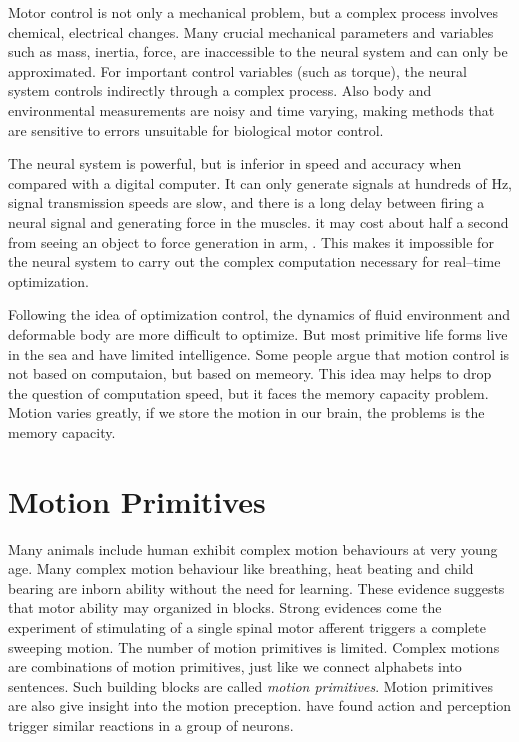 \begin{itemize}
Motor control is not only a mechanical problem, but a complex process involves chemical, electrical changes.
Many crucial mechanical parameters and variables such as mass, inertia, force, are inaccessible to the neural system and can only be approximated. 
For important control variables (such as torque), the neural system controls indirectly through a complex process.
Also body and environmental measurements are noisy and time varying, making methods that are sensitive to errors unsuitable for biological motor control.

The neural system is powerful, but is inferior in speed and accuracy when compared with a digital computer. 
It can only generate signals at hundreds of Hz, signal transmission speeds are slow, and there is a long delay between firing a neural signal and generating force in the muscles.
it may cost about half a second from seeing an object to force generation in arm, . 
This makes it impossible for the neural system to carry out the complex computation necessary for real–time optimization.


Following the idea of optimization control, the dynamics of fluid environment and deformable body are more difficult to optimize. 
But most primitive life forms live in the sea and have limited intelligence. 
Some people argue that motion control is not based on computaion, but based on memeory.
This idea may helps to drop the question of computation speed, but it faces the memory capacity problem. 
Motion varies greatly, if we store the motion in our brain, the problems is the memory capacity.
\end{itemize}

\section{Motion Primitives}
Many animals include human exhibit complex motion behaviours at very young age.
Many complex motion behaviour like breathing, heat beating and child bearing are inborn ability without the need for learning.
These evidence suggests that motor ability may organized in blocks\citep{bizzi1995modular,bizzi2002book}.
Strong evidences come the experiment of stimulating of a single spinal motor afferent triggers a complete sweeping motion\citep{bizzi1995modular}.
The number of motion primitives is limited.
Complex motions are combinations of motion primitives, just like we connect alphabets into sentences.
Such building blocks are called \emph{motion primitives}.
Motion primitives are also give insight into the motion preception.
\citet{gallese1996action} have found action and perception trigger similar reactions in a group of neurons.





